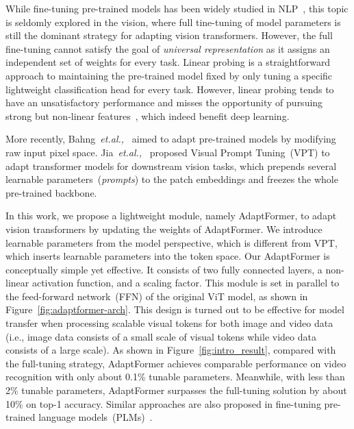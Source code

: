 While fine-tuning pre-trained models has been widely studied in NLP~\cite{bapna2019simple, houlsby-2019-adapternlp, pfeiffer-2020-adapterfusion, pfeiffer-2020-adapterhub, li-2021-prefix, lester-2021-nlpprompt, hu-2021-lora, zaken-2021-bitfit, liu-2021-ptuningv2, he2022towards}, this topic is seldomly explored in the vision, where full tine-tuning of model parameters is still the dominant strategy for adapting vision transformers. However, the full fine-tuning cannot satisfy the goal of \emph{universal representation} as it assigns an independent set of weights for every task. Linear probing is a straightforward approach to maintaining the pre-trained model fixed by only tuning a specific lightweight classification head for every task. However, linear probing tends to have an unsatisfactory performance and misses the opportunity of pursuing strong but non-linear features~\cite{he-2021-mae},  which indeed benefit deep learning.

More recently, Bahng~{\emph{et.al.,}}~\cite{bahng-2022-vp} aimed to adapt pre-trained models by modifying raw input pixel space. Jia~{\emph{et.al.,}}~\cite{jia-2022-vpt} proposed Visual Prompt Tuning~(VPT) to adapt transformer models for downstream vision tasks, which prepends several learnable parameters~(\emph{prompts}) to the patch embeddings and freezes the whole pre-trained backbone. 

In this work, we propose a lightweight module, namely AdaptFormer, to adapt vision transformers by updating the weights of AdaptFormer. We introduce learnable parameters from the model perspective, which is different from VPT, which inserts learnable parameters into the token space. Our AdaptFormer is conceptually simple yet effective. It consists of two fully connected layers, a non-linear activation function, and a scaling factor. This module is set in parallel to the feed-forward network~(FFN) of the original ViT model, as shown in Figure~\ref{fig:adaptformer-arch}. This design is turned out to be effective for model transfer when processing scalable visual tokens for both image and video data (i.e., image data consists of a small scale of visual tokens while video data consists of a large scale). As shown in Figure~\ref{fig:intro_result}, compared with the full-tuning strategy, AdaptFormer achieves comparable performance on video recognition with only about 0.1\% tunable parameters. Meanwhile, with less than 2\% tunable parameters, AdaptFormer surpasses the full-tuning solution by about 10\% on top-1 accuracy. Similar approaches are also proposed in fine-tuning pre-trained language models~(PLMs)~\cite{bapna2019simple, houlsby-2019-adapternlp, pfeiffer-2020-adapterhub, he2022towards}.

